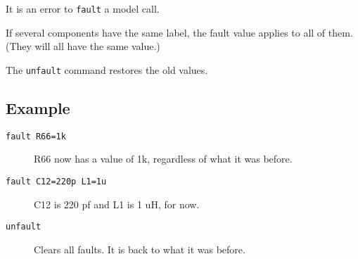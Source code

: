 It is an error to {\tt fault} a model call.

If several components have the same label, the fault value applies to all of
them.  (They will all have the same value.)

The {\tt unfault} command restores the old values.
\subsection{Example}

\begin{description}

\item[{\tt fault R66=1k}] R66 now has a value of 1k, regardless of what it
was before.

\item[{\tt fault C12=220p L1=1u}] C12 is 220 pf and L1 is 1 uH, for now.

\item[{\tt unfault}] Clears all faults.  It is back to what it was before.

\end{description}
